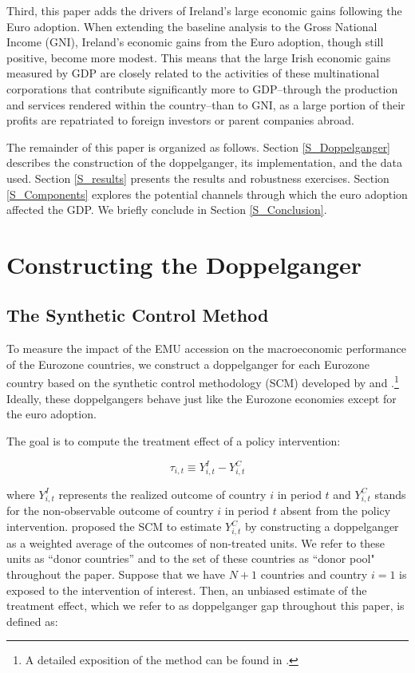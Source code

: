 \documentclass[12pt]{article}
\begin{document}
Third, this paper adds the drivers of Ireland's large economic gains following the Euro adoption. When extending the baseline analysis to the Gross National Income (GNI),  Ireland's economic gains from the Euro adoption, though still positive, become more modest. This means that the large Irish economic gains measured by GDP are closely related to the activities of these multinational corporations that contribute significantly more to GDP--through the production and services rendered within the country--than to GNI, as a large portion of their profits are repatriated to foreign investors or parent companies abroad. 


The remainder of this paper is organized as follows. Section \ref{S_Doppelganger} describes the construction of the doppelganger, its implementation, and the data used. Section \ref{S_results} presents the results and robustness exercises. Section \ref{S_Components} explores the potential channels through which the euro adoption affected the GDP. We briefly conclude in Section \ref{S_Conclusion}.

\section{Constructing the Doppelganger \label{S_Doppelganger}}

\subsection{The Synthetic Control Method \label{SS_Method}}

To measure the impact of the EMU accession on the macroeconomic performance of the Eurozone countries, we construct a doppelganger for each Eurozone country based on the synthetic control methodology (SCM) developed by \cite{Abadie2003} and \cite{Abadie2010, Abadie2015}.\footnote{A detailed exposition of the method can be found in \cite{Abadie2019}.} Ideally, these doppelgangers behave just like the Eurozone economies except for the euro adoption.

The goal is to compute the treatment effect of a policy intervention:

\begin{equation*}
    \tau_{i,t} \equiv Y_{i,t}^I - Y_{i,t}^C
\end{equation*}

where $Y_{i,t}^I$ represents the realized outcome of country $i$ in period $t$ and $Y_{i,t}^C$ stands for the non-observable outcome of country $i$ in period $t$ absent from the policy intervention. \cite{Abadie2003} proposed the SCM to estimate $Y_{i,t}^C$ by constructing a doppelganger as a weighted average of the outcomes of non-treated units. We refer to these units as ``donor countries'' and to the set of these countries as ``donor pool" throughout the paper. Suppose that we have $N + 1$ countries and country $i = 1$ is exposed to the intervention of interest. Then, an unbiased estimate of the treatment effect, which we refer to as doppelganger gap throughout this paper, is defined as:
\end{document}
